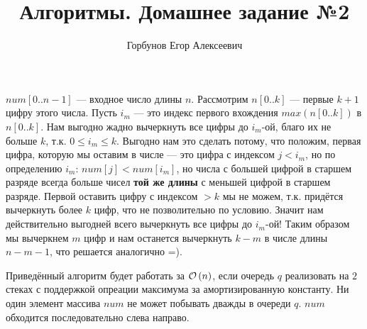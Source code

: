 
\title{Алгоритмы. Домашнее задание №2}
\author{Горбунов Егор Алексеевич}


\maketitle
{}
$num[0..n-1]$ --- входное число длины $n$. Рассмотрим $n[0..k]$ --- первые $k+1$ цифру этого числа. Пусть $i_m$ --- это
индекс первого вхождения $max(n[0..k])$ в $n[0..k]$. Нам выгодно жадно вычеркнуть все цифры до $i_m$-ой, благо их не больше
$k$, т.к. $0 \leq i_m \leq k$. Выгодно нам это сделать потому, что положим, первая цифра, которую мы оставим в числе --- это 
цифра с индексом $j < i_m$, но по определению $i_m$: $num[j]<num[i_m]$, но числа с большей цифрой в старшем разряде всегда
больше чисел \textbf{той же длины} с меньшей цифрой в старшем разряде. Первой оставить цифру с индексом $>k$ мы не можем,
т.к. придётся вычеркнуть более $k$ цифр, что не позволительно по условию. Значит нам действительно выгодней всего 
вычеркнуть все цифры до $i_m$-ой! Таким образом мы вычеркнем $m$ цифр и нам останется вычеркнуть $k-m$ 
в числе длины $n-m-1$, что решается аналогично =).

\begin{algorithmic}[1]
\EndFor
{}
	\Else
	\EndIf
\EndWhile
{}
\EndIf
\end{algorithmic}

Приведённый алгоритм будет работать за $\mathcal{O}\left(n\right)$, если очередь $q$ реализовать на $2$ стеках с поддержкой опреации
максимума за амортизированную константу. Ни один элемент массива $num$ не может побывать дважды в очереди $q$. $num$
обходится последовательно слева направо.

